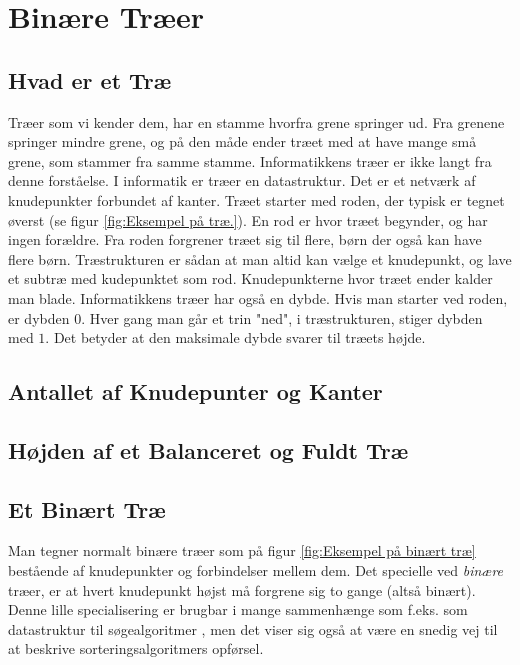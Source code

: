 \chapter{Binære Træer}
\label{ch:Binære Træer}


\section{Hvad er et Træ}
\label{sec:Hvad er et Træ}

Træer som vi kender dem, har en stamme hvorfra grene springer ud. Fra grenene springer mindre grene, og på den måde ender træet med at have mange små grene, som stammer fra samme stamme. Informatikkens træer er ikke langt fra denne forståelse. I informatik er træer en datastruktur. Det er et netværk af knudepunkter forbundet af kanter. Træet starter med roden, der typisk er tegnet øverst (se figur \ref{fig:Eksempel på træ.}). En rod er hvor træet begynder, og har ingen forældre. Fra roden forgrener træet sig til flere, børn der også kan have flere børn. Træstrukturen er sådan at man altid kan vælge et knudepunkt, og lave et subtræ med kudepunktet som rod. Knudepunkterne hvor træet ender kalder man blade. Informatikkens træer har også en dybde. Hvis man starter ved roden, er dybden $0$. Hver gang man går et trin "ned", i træstrukturen, stiger dybden med $1$. Det betyder at den maksimale dybde svarer til træets højde. \cite{trees}

\section{Antallet af Knudepunter og Kanter}
\label{sec:Antallet af Knudepunter og Kanter}


\section{Højden af et Balanceret og Fuldt Træ}
\label{sec:Højden af et Balanceret og Fuldt Træ}



\section{Et Binært Træ}
\label{sec:Et Binært Træ}

Man tegner normalt binære træer som på figur \ref{fig:Eksempel på binært træ} bestående af knudepunkter og forbindelser mellem dem. Det specielle ved \emph{binære} træer, er at hvert knudepunkt højst må forgrene sig to gange (altså binært). Denne lille specialisering er brugbar i mange sammenhænge som f.eks. som datastruktur til søgealgoritmer \cite{BST}, men det viser sig også at være en snedig vej til at beskrive sorteringsalgoritmers opførsel.

